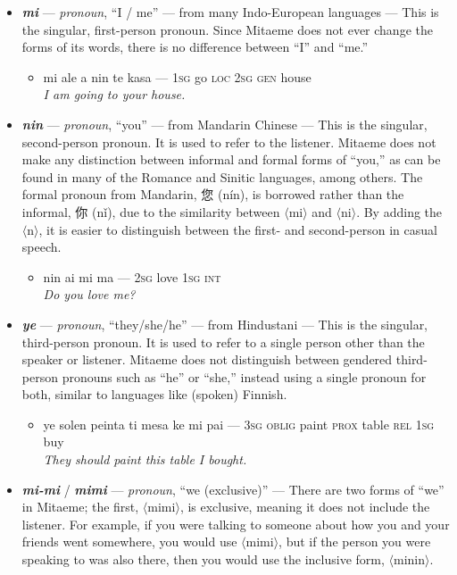 \documentclass[a4paper]{article}
\begin{document}
\begin{itemize}
	\item \textbf{\textit{mi}} — \textit{pronoun}, ``I / me'' — from many Indo-European languages — This is the singular, first-person pronoun. Since Mitaeme does not ever change the forms of its words, there is no difference between ``I'' and ``me.''
	\begin{itemize}
		\item mi ale a nin te kasa — \textsc{1sg} go \textsc{loc 2sg gen} house \\\textit{I am going to your house.}
	\end{itemize}
	\item \textbf{\textit{nin}} — \textit{pronoun}, ``you'' — from Mandarin Chinese — This is the singular, second-person pronoun. It is used to refer to the listener. Mitaeme does not make any distinction between informal and formal forms of ``you,'' as can be found in many of the Romance and Sinitic languages, among others. The formal pronoun from Mandarin, 您 (nín), is borrowed rather than the informal, 你 (nǐ), due to the similarity between $\langle$mi$\rangle$ and $\langle$ni$\rangle$. By adding the $\langle$n$\rangle$, it is easier to distinguish between the first- and second-person in casual speech.
	\begin{itemize}
		\item nin ai mi ma — \textsc{2sg} love \textsc{1sg int} \\\textit{Do you love me?}
	\end{itemize}
	\item \textbf{\textit{ye}} — \textit{pronoun}, ``they/she/he'' — from Hindustani — This is the singular, third-person pronoun. It is used to refer to a single person other than the speaker or listener. Mitaeme does not distinguish between gendered third-person pronouns such as ``he'' or ``she,'' instead using a single pronoun for both, similar to languages like (spoken) Finnish.
	\begin{itemize}
		\item ye solen peinta ti mesa ke mi pai — \textsc{3sg oblig} paint \textsc{prox} table \textsc{rel 1sg} buy \\\textit{They should paint this table I bought.}
	\end{itemize}
	\item \textbf{\textit{mi-mi}} / \textbf{\textit{mimi}} — \textit{pronoun}, ``we (exclusive)'' — There are two forms of ``we'' in Mitaeme; the first, $\langle$mimi$\rangle$, is exclusive, meaning it does not include the listener. For example, if you were talking to someone about how you and your friends went somewhere, you would use $\langle$mimi$\rangle$, but if the person you were speaking to was also there, then you would use the inclusive form, $\langle$minin$\rangle$.

\end{itemize}
\end{document}
